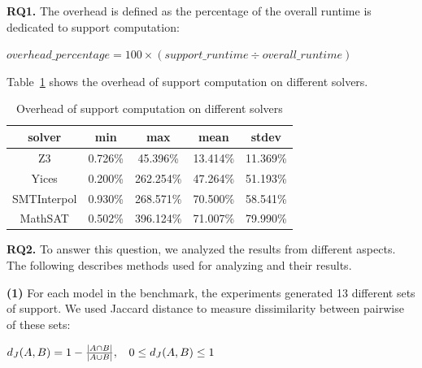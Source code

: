 \textbf{RQ1.} The overhead is defined as the percentage of the overall runtime is dedicated to support computation:

\mbox{$overhead\_percentage = 100 \times (support\_runtime \div overall\_runtime)$}

 Table~\ref{tab:overhead} shows the overhead of support computation on different solvers.


\begin{table}
  \centering
  \begin{tabular}{ |c||c|c|c|c| }
    \hline
     solver & min & max & mean & stdev \\[0.5ex]
    \hline
    Z3   & 0.726\% & 45.396\% & 13.414\% & 11.369\% \\[0.5ex]
    Yices &   0.200\%  & 262.254\%   & 47.264\% & 51.193\% \\[0.5ex]
    SMTInterpol& 0.930\% & 268.571\% &  70.500\% & 58.541\%\\[0.5ex]
    MathSAT & 0.502\% & 396.124\% &  71.007\% & 79.990\%\\[0.5ex]
    \hline
  \end{tabular}
  \caption{\small{Overhead of support computation on different solvers}}
  \label{tab:overhead}
\end{table}

\vspace{6pt}
\noindent{}
 \vspace{9pt}

\textbf{RQ2.} To answer this question, we analyzed the results from different aspects. The following describes methods used for analyzing and their results.

\textbf{(1)} For each model in the benchmark, the experiments generated 13 different sets of support. We used Jaccard distance to measure dissimilarity between pairwise of these sets:

\begin{center}
$d_J(\small{A}, \small{B}) = 1 - \frac{|A \cap B|}{|A \cup B|} ,\hspace{9pt} 0 \leq d_J(\small{A}, \small{B}) \leq 1$
\end{center}
\vspace{6pt} 

